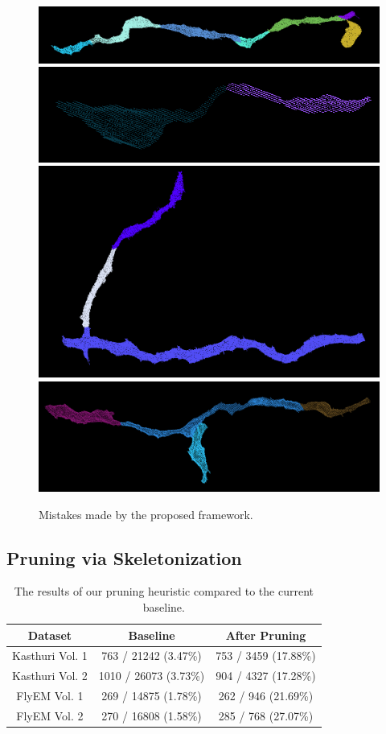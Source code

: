\begin{figure}[t]
	\centering
	\includegraphics[width=0.85\linewidth]{./figures/multicut-incorrect1.png}
	\includegraphics[width=0.85\linewidth]{./figures/multicut-incorrect2.png}
	\includegraphics[width=0.85\linewidth]{./figures/multicut-incorrect3.png}
	\includegraphics[width=0.85\linewidth]{./figures/multicut-incorrect4.png}
	\caption{Mistakes made by the proposed framework.}
	\label{fig:negative-results}
\end{figure}


\subsection{Pruning via Skeletonization}

\begin{table}
	\centering
	\small
	\begin{tabular}{c c c} \hline
		\textbf{Dataset} & \textbf{Baseline} & \textbf{After Pruning} \\ \hline
		Kasthuri Vol. 1 & 763 / 21242 (3.47\%) & 753 / 3459 (17.88\%) \\
		Kasthuri Vol. 2 & 1010 / 26073 (3.73\%) & 904 / 4327 (17.28\%) \\
		FlyEM Vol. 1 & 269 / 14875 (1.78\%) & 262 / 946 (21.69\%) \\
		FlyEM Vol. 2 & 270 / 16808 (1.58\%) & 285 / 768 (27.07\%)\\ \hline
	\end{tabular}
	\caption{The results of our pruning heuristic compared to the current baseline.}
	\label{table:skeletonization}
\end{table}

